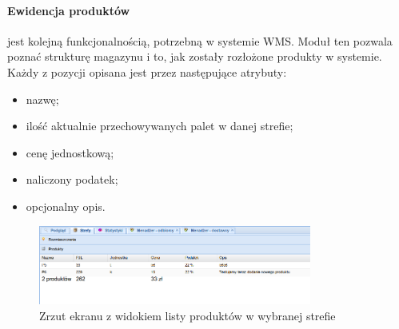 		\paragraph{Ewidencja produktów} jest kolejną funkcjonalnością, potrzebną w systemie WMS.
		Moduł ten pozwala poznać strukturę magazynu i to, jak zostały rozłożone produkty w systemie.
		Każdy z pozycji opisana jest przez następujące atrybuty: 
		\begin{itemize}
			\item nazwę;
			\item ilość aktualnie przechowywanych palet w danej strefie;
			\item cenę jednostkową;
			\item naliczony podatek;
			\item opcjonalny opis.
		\end{itemize}
		\begin{figure}[h]
			\centering
			\includegraphics[width=0.8\textwidth]{images/app/unit_products_preview}
			\caption[Aplikacja - Ewidencja towarów w poszczególnych strefach]{Zrzut ekranu z widokiem listy produktów w wybranej strefie}
			\label{c7:fig:app:unit_products_preview}
		\end{figure}